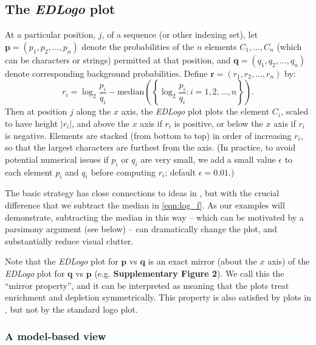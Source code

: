 \documentclass{bmcart}
\def\p{{\mathbf p}}
\def\q{{\mathbf q}}
\def\r{{\mathbf r}}
\begin{document}
\subsection*{The \textit{EDLogo} plot}

At a particular position, $j$, of a sequence (or other indexing set), let $\p = \left( p_{1}, p_{2}, \ldots, p_n \right)$ 
denote the probabilities of the $n$ elements $C_1,\dots,C_n$ (which can be characters or strings) permitted at that position, and $\q =\left( q_{1}, q_{2}, \ldots, q_{n} \right)$ denote corresponding background probabilities.
Define $\r =  \left( r_{1}, r_{2}, \ldots, r_{n} \right)$ by: 
\begin{equation} \label{eqn:log_f}
r_i = \log_2 \frac{p_i}{q_i} - \textrm{median} \left ( \left \{ \log_2 \frac{p_i}{q_i} : i = 1, 2, \ldots, n \right \} \right ).
\end{equation}
Then at position $j$ along the $x$ axis,
the \textit{EDLogo} plot plots the element $C_i$, scaled to have height $|r_i|$,
and above the $x$ axis if $r_i$ is positive, or below the $x$ axis if $r_i$ is negative.  Elements
are stacked (from bottom to top) in order of increasing $r_i$,  
so that the largest characters are furthest from the axis.
(In practice, to avoid potential numerical issues if $p_i$ or $q_i$ are very small, we add
a small value $\epsilon$ to each element $p_i$ and $q_i$ before computing $r_i$; default $\epsilon=0.01$.)

The basic strategy has close connections to ideas in \cite{Thomsen2012}, but with the crucial difference
that we subtract the median in \ref{eqn:log_f}. As our examples will demonstrate,
subtracting the median in this way -- which can be motivated
by a parsimony argument (see below) -- can dramatically change the plot, and substantially reduce
visual clutter.

Note that the \textit{EDLogo} plot for $\p$ vs $\q$ is
an exact mirror (about the $x$ axis) of the \textit{EDLogo} plot for $\q$ vs $\p$ (e.g. \textbf{Supplementary Figure 2}). We call this the ``mirror property'', and it can be
interpreted as meaning that the plots treat enrichment and depletion symmetrically. This property is also satisfied by plots in \cite{Thomsen2012}, but not by the standard logo plot.

\subsubsection*{A model-based view}
 
\end{document}

